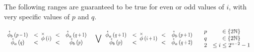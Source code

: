 The following ranges are guaranteed to be true for even or odd values of $i$, with very specific values of $p$ and $q$.
%


\begin{align*}
\begin{array}{cc}
  \extremaTheta{b}{p-1} & < \\
  \extremaTheta{a} {q} & < 
\end{array}
&\thetaX{i} 
\begin{array}{cc}
  < & \extremaTheta{a}{q+1}  \\
  < & \extremaTheta{b}{p}  
\end{array} 
& \bigvee
\begin{array}{cc}
  \extremaTheta{a}{q+1} & < \\
  \extremaTheta{b} {p} & < 
\end{array}
&\thetaX{i+1} 
\begin{array}{cc}
  < & \extremaTheta{b}{p+1}  \\
  < & \extremaTheta{a}{q+2}  
\end{array} & 
\begin{array}{cc}
p  &\in \{ 2 \mathbb{N}  \}  \\
q  &\in \{ 2 \mathbb{N}  \}  \\
2  & \le i  \le 2^{n-2} -1
\end{array}
\end{align*}

